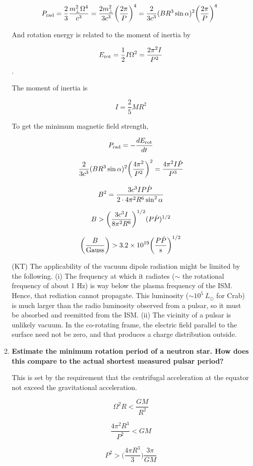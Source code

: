 \documentclass[a4paper]{article}
\begin{document}
\begin{enumerate}
$$ P_{\rm rad} = {2 \over 3} { m_\bot^2 \Omega^4 \over c^3} = {2
m_\bot^2 \over 3 c^3} \biggl( {2 \pi \over P} \biggr)^4 = {2 \over 3
c^3} ( B R^3 \sin \alpha)^2 \biggl( {2 \pi \over P} \biggr)^4~ $$

And rotation energy is related to the moment of inertia by

$$ E_{\rm rot} = \frac{1}{2}I \Omega^2 = {2 \pi^2 I
\over P^2} $$. 

The moment of inertia is

$$ I = \frac{2}{5} M R^2 $$

To get the minimum magnetic field strength,

$$ P_{\rm rad} = - {d E_{\rm rot} \over d t} $$

$$ {2 \over 3 c^3} (B R^3 \sin \alpha)^2 \biggl( { 4 \pi^2 \over P^2}
\biggr)^2 = {4 \pi^2 I \dot{P} \over P^3} $$

$$ B^2 = { 3 c^3 I P \dot{P} \over 2 \cdot 4 \pi^2 R^6 \sin^2\alpha } $$

$$ B > \biggl( { 3 c^3 I \over 8 \pi^2 R^6} \biggr)^{1/2} (P \dot{P})^{1/2} $$

$$ \biggl( { B \over {\rm Gauss}}
\biggr) > 3.2 \times 10^{19} \biggl( 
{ P \dot{P} \over {\rm s} } 
\biggr)^{1/2} $$

(KT) The applicability of the vacuum dipole radiation might be limited by the following. 
(i) The frequency at which it radiates ($\sim$ the rotational frequency of about 1 Hz) is way below the plasma frequency of the ISM. Hence, that rediation cannot propagate. This luminosity ($\sim 10^5 \ L_{\odot}$ for Crab) is much larger than the radio luminosity observed from a pulsar, so it must be absorbed and reemitted from the ISM. 
(ii) The vicinity of a pulsar is unlikely vacuum. In the co-rotating frame, the electric field parallel to the surface need not be zero, and that produces a charge distribution outside. 

\item \textbf{Estimate the minimum rotation period of a neutron star. How does this compare to the
actual shortest measured pulsar period?}

This is set by the requirement that the centrifugal acceleration at the equator not exceed the gravitational acceleration.

$$ \Omega^2 R < {\frac{G M} {R^2}} $$

$$ {\frac{4 \pi^2 R^3} {P^2}} < GM $$

$$ P^2 > \biggl( { \frac{4 \pi R^3}{3}} \biggr) {\frac{3 \pi}{GM}} $$


\end{enumerate}
\end{document}
